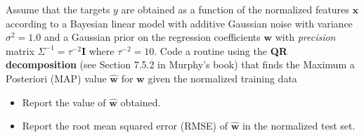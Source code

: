 \documentclass[submit]{harvardml}
\begin{document}
\begin{problem}[7pts]\label{prob:analytic_linear_model}
Assume that the targets $y$ are obtained as a function of the normalized
features $\mathbf{x}$ according to a Bayesian linear model with additive Gaussian noise with variance
$\sigma^2 = 1.0$ and a Gaussian prior on the regression coefficients $\mathbf{w}$
with \textit{precision} matrix $\Sigma^{-1} = \tau^{-2}\mathbf{I}$ where $\tau^{-2} = 10$. Code a routine
using the \textbf{QR decomposition} (see Section 7.5.2 in Murphy's book) that finds the Maximum a
Posteriori (MAP) value $\hat{\mathbf{w}}$ for $\mathbf{w}$ given the normalized
training data
\begin{itemize}
\item Report the value of $\hat{\mathbf{w}}$ obtained.
\item Report the root mean squared error (RMSE) of $\hat{\mathbf{w}}$ in the normalized test set.
\end{itemize}
\vspace{0.1cm}
\end{problem}
\end{document}
